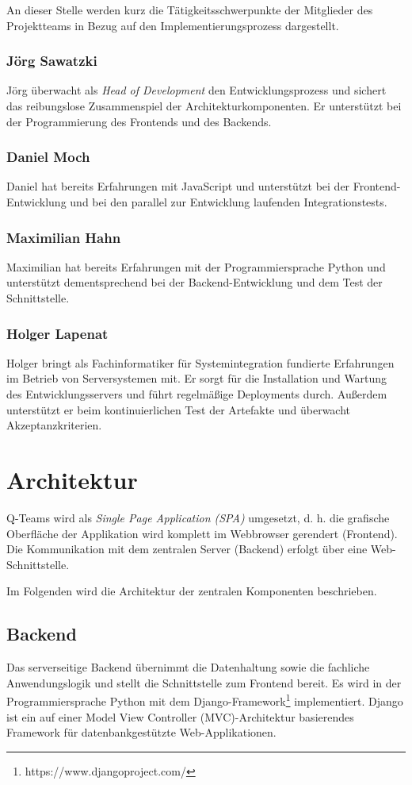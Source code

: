 \documentclass[a4paper,11pt,listof=numbered,glossary=totoc,parskip=half,toc=bib]{scrreprt}
\begin{document}
	An dieser Stelle werden kurz die Tätigkeitsschwerpunkte der Mitglieder des Projektteams in Bezug auf den Implementierungsprozess dargestellt.
	
	\subsubsection{Jörg Sawatzki}
	Jörg überwacht als \textit{Head of Development} den Entwicklungsprozess und sichert das reibungslose Zusammenspiel der Architekturkomponenten. Er unterstützt bei der Programmierung des Frontends und des Backends.
	
	\subsubsection{Daniel Moch}
	Daniel hat bereits Erfahrungen mit JavaScript und unterstützt bei der Frontend-Entwicklung und bei den parallel zur Entwicklung laufenden Integrationstests.
	
	\subsubsection{Maximilian Hahn}
	Maximilian hat bereits Erfahrungen mit der Programmiersprache Python und unterstützt dementsprechend bei der Backend-Entwicklung und dem Test der Schnittstelle.
	
	\subsubsection{Holger Lapenat}
	Holger bringt als Fachinformatiker für Systemintegration fundierte Erfahrungen im Betrieb von Serversystemen mit. Er sorgt für die Installation und Wartung des Entwicklungsservers und führt regelmäßige Deployments durch. Außerdem unterstützt er beim kontinuierlichen Test der Artefakte und überwacht Akzeptanzkriterien.

	
	\section{Architektur}
	\label{sec:architektur}
		Q-Teams wird als \textit{Single Page Application (SPA)} umgesetzt, d. h. die grafische Oberfläche der Applikation wird komplett im Webbrowser gerendert (Frontend). Die Kommunikation mit dem zentralen Server (Backend) erfolgt über eine Web-Schnittstelle.
		
		Im Folgenden wird die Architektur der zentralen Komponenten beschrieben.
		
	\subsection{Backend}
	\label{subsec:backend}
	Das serverseitige Backend übernimmt die Datenhaltung sowie die fachliche Anwendungslogik und stellt die Schnittstelle zum Frontend bereit. Es wird in der Programmiersprache Python mit dem Django-Framework\footnote{https://www.djangoproject.com/} implementiert. Django ist ein auf einer \frqq{}Model View Controller (MVC)\flqq{}-Architektur basierendes Framework für datenbankgestützte Web-Applikationen.
	
\end{document}
